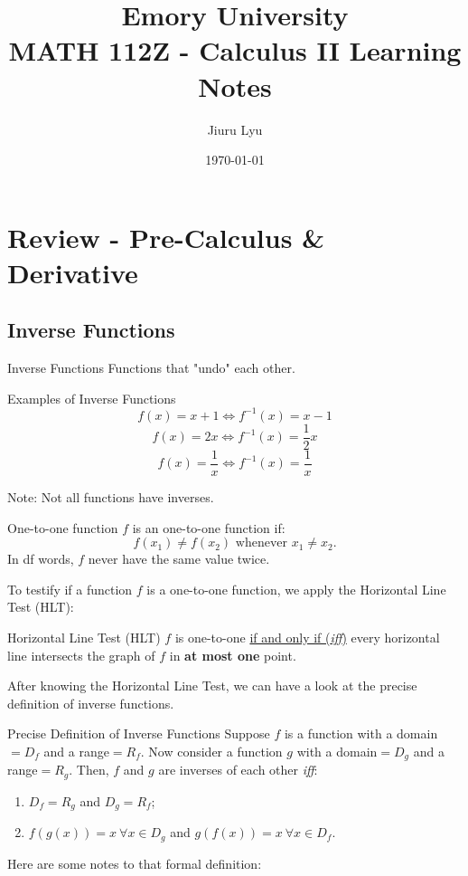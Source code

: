 \documentclass[12pt,a4paper]{article}
\title{Emory University\\\textbf{MATH 112Z - Calculus II Learning Notes}}
\author{Jiuru Lyu}
\date{\today}
\begin{document}
\maketitle
\tableofcontents
\newpage

\section{Review - Pre-Calculus \& Derivative}
\subsection{Inverse Functions}
\begin{df}{Inverse Functions}
	Functions that "undo" each other.
\end{df}
\begin{eg}{Examples of Inverse Functions}
	$$f(x)=x+1 \Longleftrightarrow f^{-1}(x)=x-1$$
	$$f(x)=2x \Longleftrightarrow f^{-1}(x)=\dfrac{1}{2}x$$
	$$f(x)=\dfrac{1}{x} \Longleftrightarrow f^{-1}(x)=\dfrac{1}{x}$$
\end{eg}
Note: Not all functions have inverses.
\begin{df}{One-to-one function}
	$f$ is an one-to-one function if: 
	$$f(x_1)\neq f(x_2)\text{ whenever }x_1\neq x_2.$$
	In df words, $f$ never have the same value twice. 
\end{df}
To testify if a function $f$ is a one-to-one function, we apply the Horizontal Line Test (HLT): 
\begin{thm}{Horizontal Line Test (HLT)}
	$f$ is one-to-one \underline{if and only if (\textit{iff})} every horizontal line intersects the graph of $f$ in \textbf{at most one} point.
\end{thm}
After knowing the Horizontal Line Test, we can have a look at the precise definition of inverse functions. 
\begin{df}{Precise Definition of Inverse Functions}
	Suppose $f$ is a function with a domain$=D_f$ and a range$=R_f$. Now consider a function $g$ with a domain$=D_g$ and a range$=R_g$. Then, $f$ and $g$ are inverses of each other \textit{iff}: 
	\begin{enumerate}
		\item $D_f=R_g$ and $D_g=R_f$;
		\item $f(g(x))=x\ \forall x\in D_g$ and $g(f(x))=x\ \forall x\in D_f$.
	\end{enumerate}
\end{df}
Here are some notes to that formal definition: 
\end{document}
